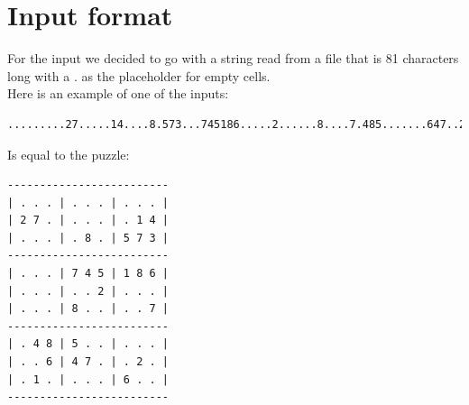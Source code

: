 \documentclass{article}
\begin{document}
\section{Input format}

For the input we decided to go with a string read from a file that is 81 characters long with a . as the placeholder for empty cells.\\
\newline
Here is an example of one of the inputs:
\newline
\begin{verbatim}
.........27.....14....8.573...745186.....2......8....7.485.......647..2..1....6..
\end{verbatim}
Is equal to the puzzle:
\begin{verbatim}
-------------------------
| . . . | . . . | . . . |
| 2 7 . | . . . | . 1 4 |
| . . . | . 8 . | 5 7 3 |
-------------------------
| . . . | 7 4 5 | 1 8 6 |
| . . . | . . 2 | . . . |
| . . . | 8 . . | . . 7 |
-------------------------
| . 4 8 | 5 . . | . . . |
| . . 6 | 4 7 . | . 2 . |
| . 1 . | . . . | 6 . . |
-------------------------
\end{verbatim}

\newpage
\end{document}
